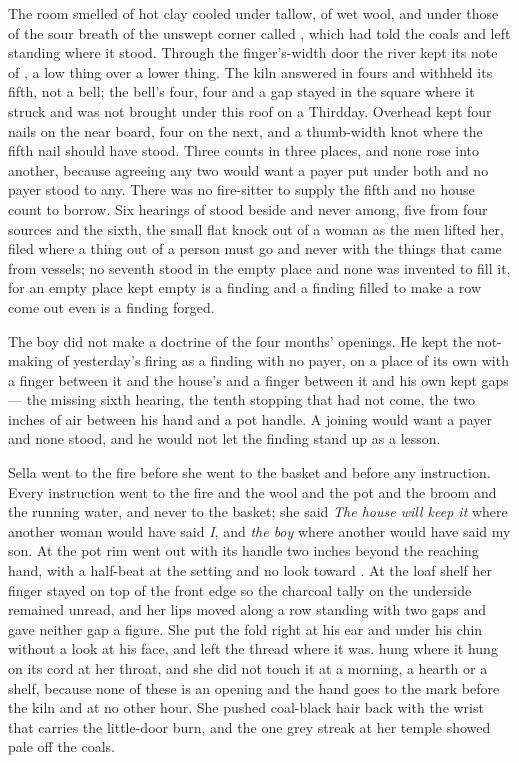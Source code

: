 The room smelled of hot clay cooled under tallow, of wet wool, and under those of the sour breath of the unswept corner called , which  had told the coals and left standing where it stood. Through the finger's-width door the river kept its note of , a low thing over a lower thing. The kiln answered in fours and withheld its fifth, not a bell; the bell's four, four and a gap stayed in the square where it struck and was not brought under this roof on a Thirdday. Overhead  kept four nails on the near board, four on the next, and a thumb-width knot where the fifth nail should have stood. Three counts in three places, and none rose into another, because agreeing any two would want a payer put under both and no payer stood to any. There was no fire-sitter to supply the fifth and no house count to borrow. Six hearings of  stood beside and never among, five from four sources and the sixth, the small flat knock out of a woman as the men lifted her, filed where a thing out of a person must go and never with the things that came from vessels; no seventh stood in the empty place and none was invented to fill it, for an empty place kept empty is a finding and a finding filled to make a row come out even is a finding forged.

The boy did not make a doctrine of the four months' openings. He kept the not-making of yesterday's firing as a finding with no payer, on a place of its own with a finger between it and the house's  and a finger between it and his own kept gaps --- the missing sixth hearing, the tenth stopping that had not come, the two inches of air between his hand and a pot handle. A joining would want a payer and none stood, and he would not let the finding stand up as a lesson.

Sella went to the fire before she went to the basket and before any instruction. Every instruction went to the fire and the wool and the pot and the broom and the running water, and never to the basket; she said \emph{The house will keep it} where another woman would have said \emph{I}, and \emph{the boy} where another would have said my son. At  the pot rim went out with its handle two inches beyond the reaching hand, with a half-beat at the setting and no look toward . At the loaf shelf her finger stayed on top of the front edge so the charcoal tally on the underside remained unread, and her lips moved along a row standing with two gaps and gave neither gap a figure. She put the fold right at his ear and under his chin without a look at his face, and left the thread where it was.  hung where it hung on its cord at her throat, and she did not touch it at a morning, a hearth or a shelf, because none of these is an opening and the hand goes to the mark before the kiln and at no other hour. She pushed coal-black hair back with the wrist that carries the little-door burn, and the one grey streak at her temple showed pale off the coals.

